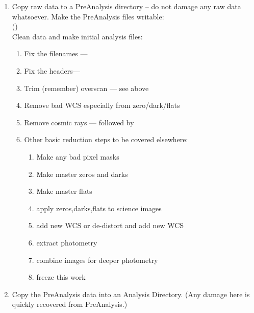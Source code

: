 \documentclass[letter,11pt,oneside]{article}
\begin{document}
\vspace{-.15cm}
\begin{enumerate}[resume]\addtolength{\itemsep}{-0.5\baselineskip}
   \item   Copy raw data to a PreAnalysis directory -- do not damage any
raw data whatsoever. Make the PreAnalysis files writable:\\
({\color{verbcolor}{\verb#cd Observations/YYYYmmDD; mkdir -p PreAnalysis; cd PreAnalysis; cp -pr ../RawData/* .; chmod +w -R .#}})\\
Clean data and make initial analysis files:
\vspace{-.15cm}
\begin{enumerate}\addtolength{\itemsep}{-0.5\baselineskip}
   \item   Fix the filenames --- {\color{verbcolor}{\verb#cl < ~sbo/iraf/fix_sbig.cl#}}
   \item   Fix the headers--- {\color{verbcolor}{\verb#cl < ~sbo/iraf/fix_headers.cl#}}
   \item   Trim (remember) overscan --- see above
   \item   Remove bad WCS especially from zero/dark/flats {\color{verbcolor}{\verb#cl < ~sbo/iraf/fix_sbig_wcs.cl#}}
   \item   Remove cosmic rays ---  {\color{verbcolor}{\verb#!ls -1 *fits > l.l#}}
followed by {\color{verbcolor}{\verb#cl < ~sbo/iraf/crall.cl#}}
\item Other basic reduction steps to be covered elsewhere:
\begin{enumerate}\addtolength{\itemsep}{-0.5\baselineskip}
   \item   Make any bad pixel masks 
   \item   Make master zeros and darks 
   \item   Make master flats 
   \item   apply zeros,darks,flats to science images
   \item   add new WCS or de-distort and add new WCS
   \item   extract photometry
   \item   combine images for deeper photometry
   \item   freeze this work
\end{enumerate}
\end{enumerate}


   \item  Copy the PreAnalysis data into an Analysis Directory.
(Any damage here is quickly recovered from PreAnalysis.)\\
{\color{verbcolor}{\verb#!(cd ..; mkdir -p Analysis; cd Analysis; cp -pr ../PreAnalysis/f_d_z_c_t* .)#}}
\end{enumerate}
\end{document}
